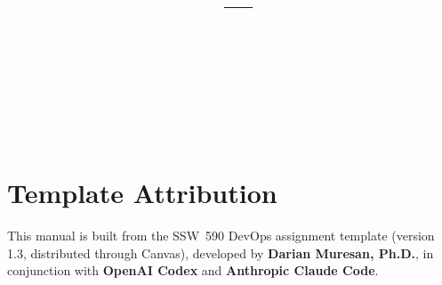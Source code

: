 \title{\CourseNumber\ --- \CourseName\\[0.5em]\large \AssignmentTitle\\[1.5em]\normalsize\VERSION\\\DocumentStatus}
\author{\StudentName\\\Organization}
\conferraldate{}{\DocumentDate}
\copyrightholder{\Organization}
\maketitle
\makecopyright

\cleardoublepage
{}
\chapter*{Template Attribution}
This manual is built from the SSW~590 DevOps assignment template (version
1.3, distributed through Canvas), developed by \textbf{Darian Muresan, Ph.D.},
in conjunction with \textbf{OpenAI Codex} and \textbf{Anthropic Claude Code}.

\clearpage
\begin{abstract}\end{abstract}

\contentspage
\tablelistpage
\figurelistpage
